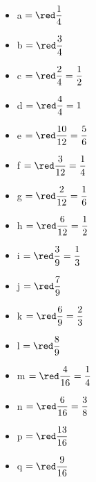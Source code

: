 \begin{corrige}
   \phantom{rrr}

   \begin{multicols}{2}
      \begin{itemize}
         \item a $=\red \dfrac14$ \medskip
         \item b $=\red \dfrac34$ \medskip
         \item c $=\red \dfrac24 =\dfrac12$ \medskip
         \item d $=\red \dfrac44 =1$ \medskip
         \item e $=\red \dfrac{10}{12} =\dfrac56$ \medskip
         \item f $=\red \dfrac{3}{12} =\dfrac14$
         \item g $=\red \dfrac{2}{12} =\dfrac16$
         \item h $=\red \dfrac{6}{12} =\dfrac12$
         \item i $=\red \dfrac39 =\dfrac13$
         \item j $=\red \dfrac79$
         \item k $=\red \dfrac69 =\dfrac23$
         \item l $=\red \dfrac89$
         \item m $=\red \dfrac{4}{16} =\dfrac14$
         \item n $=\red \dfrac{6}{16} =\dfrac38$
         \item p $=\red \dfrac{13}{16}$
         \item q $=\red \dfrac{9}{16}$
      \end{itemize}
   \end{multicols}
\end{corrige}